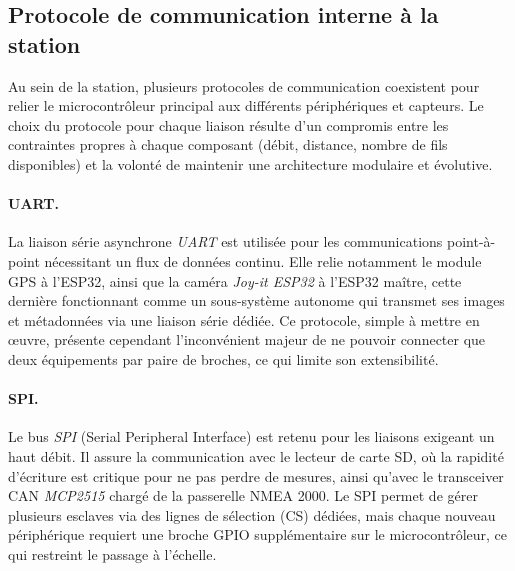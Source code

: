 \subsection{Protocole de communication interne à la station}\label{subsec:protocole_interne}

Au sein de la station, plusieurs protocoles de communication coexistent pour
relier le microcontrôleur principal aux différents périphériques et capteurs.
Le choix du protocole pour chaque liaison résulte d'un compromis entre les
contraintes propres à chaque composant (débit, distance, nombre de fils
disponibles) et la volonté de maintenir une architecture modulaire et évolutive.

\paragraph{UART.}
La liaison série asynchrone \textit{UART} est utilisée pour les communications
point-à-point nécessitant un flux de données continu. Elle relie notamment le
module GPS à l'ESP32, ainsi que la caméra \textit{Joy-it ESP32} à l'ESP32
maître, cette dernière fonctionnant comme un sous-système autonome qui transmet
ses images et métadonnées via une liaison série dédiée. Ce protocole, simple
à mettre en œuvre, présente cependant l'inconvénient majeur de ne pouvoir
connecter que deux équipements par paire de broches, ce qui limite son
extensibilité.

\paragraph{SPI.}
Le bus \textit{SPI} (Serial Peripheral Interface) est retenu pour les liaisons
exigeant un haut débit. Il assure la communication avec le lecteur de carte SD,
où la rapidité d'écriture est critique pour ne pas perdre de mesures, ainsi
qu'avec le transceiver CAN \textit{MCP2515} chargé de la passerelle NMEA 2000.
Le SPI permet de gérer plusieurs esclaves via des lignes de sélection (CS)
dédiées, mais chaque nouveau périphérique requiert une broche GPIO supplémentaire
sur le microcontrôleur, ce qui restreint le passage à l'échelle.

